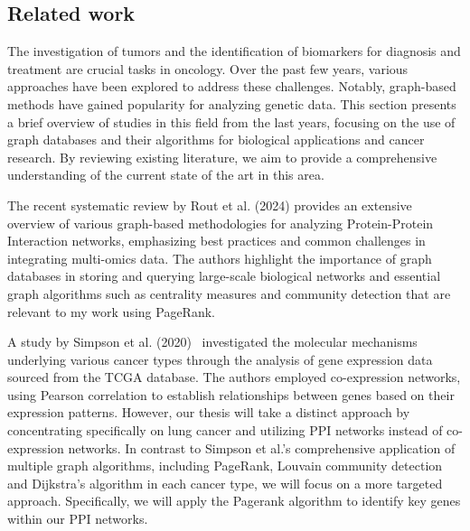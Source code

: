 \subsection{Related work} \label{subsec:related_work}
The investigation of tumors and the identification of biomarkers for diagnosis and treatment are crucial tasks in oncology. %
Over the past few years, various approaches have been explored to address these challenges.
Notably, graph-based methods have gained popularity for analyzing genetic data.
This section presents a brief overview of studies in this field from the last years,
focusing on the use of graph databases and their algorithms for biological applications and cancer research.
By reviewing existing literature, we aim to provide a comprehensive understanding of the current state of the art in this area.


The recent systematic review by Rout et al. (2024) \cite{rout2024systematic} provides an extensive overview of
various graph-based methodologies for analyzing Protein-Protein Interaction networks,
emphasizing best practices and common challenges in integrating multi-omics data. %
The authors highlight the importance of graph databases in storing and querying large-scale biological networks
and essential graph algorithms such as centrality measures and community detection that are relevant to my work using PageRank.


A study by Simpson et al. (2020)~\cite{simpson2020applying} investigated the molecular mechanisms underlying various cancer types
through the analysis of gene expression data sourced from the TCGA database.
The authors employed co-expression networks, using Pearson correlation to establish relationships between genes based on their expression patterns.
However, our thesis will take a distinct approach by concentrating specifically on lung cancer
and utilizing PPI networks instead of co-expression networks.
In contrast to Simpson et al.'s comprehensive application of multiple graph algorithms, including PageRank,
Louvain community detection and Dijkstra's algorithm in each cancer type, we will focus on a more targeted approach.
Specifically, we will apply the Pagerank algorithm to identify key genes within our PPI networks.



